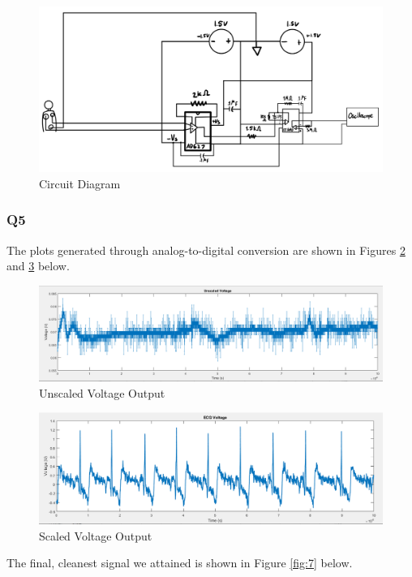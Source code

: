 \documentclass[
	letterpaper, %
	10pt, %
]{CSUniSchoolLabReport}
\begin{document}
\begin{figure}[H]
  \centering
  \includegraphics[width=.9\textwidth]{Figures/L15Q4-2.png}
  \caption{Circuit Diagram}
  \label{fig:4}
\end{figure}

\subsubsection{Q5} The plots generated through analog-to-digital conversion are shown in Figures \ref{fig:5} and \ref{fig:6} below.

\begin{figure}[H]
  \centering
  \includegraphics[width=.9\textwidth]{Figures/L15Q5.png}
  \caption{Unscaled Voltage Output}
  \label{fig:5}
\end{figure}

\begin{figure}[H]
  \centering
  \includegraphics[width=.9\textwidth]{Figures/L15Q5-2.png}
  \caption{Scaled Voltage Output}
  \label{fig:6}
\end{figure}

The final, cleanest signal we attained is shown in Figure \ref{fig:7} below.
\end{document}
